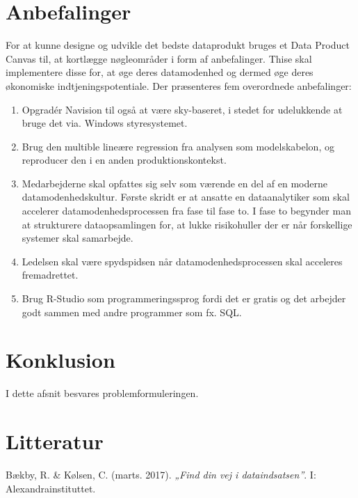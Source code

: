 \documentclass[
  12pt,
  a4paper,
  DIV=11,
  numbers=noendperiod]{scrartcl}
\providecommand{\tightlist}{%
  \setlength{\itemsep}{0pt}\setlength{\parskip}{0pt}}\usepackage{longtable,booktabs,array}
\begin{document}
\hypertarget{anbefalinger}{%
\section{Anbefalinger}\label{anbefalinger}}

For at kunne designe og udvikle det bedste dataprodukt bruges et Data
Product Canvas til, at kortlægge nøgleområder i form af anbefalinger.
Thise skal implementere disse for, at øge deres datamodenhed og dermed
øge deres økonomiske indtjeningspotentiale. Der præsenteres fem
overordnede anbefalinger:

\begin{enumerate}
\def\labelenumi{\arabic{enumi}.}
\tightlist
\item
  Opgradér Navision til også at være sky-baseret, i stedet for
  udelukkende at bruge det via. Windows styresystemet.
\item
  Brug den multible lineære regression fra analysen som modelskabelon,
  og reproducer den i en anden produktionskontekst.
\item
  Medarbejderne skal opfattes sig selv som værende en del af en moderne
  datamodenhedskultur. Første skridt er at ansatte en dataanalytiker som
  skal accelerer datamodenhedsprocessen fra fase til fase to. I fase to
  begynder man at strukturere dataopsamlingen for, at lukke risikohuller
  der er når forskellige systemer skal samarbejde.
\item
  Ledelsen skal være spydspidsen når datamodenhedsprocessen skal
  acceleres fremadrettet.
\item
  Brug R-Studio som programmeringssprog fordi det er gratis og det
  arbejder godt sammen med andre programmer som fx. SQL.
\end{enumerate}

\hypertarget{konklusion}{%
\section{Konklusion}\label{konklusion}}

I dette afsnit besvares problemformuleringen.

\hypertarget{litteratur}{%
\section{Litteratur}\label{litteratur}}

Bækby, R. \& Kølsen, C. (marts. 2017). \emph{„Find din vej i
dataindsatsen''}. I: Alexandrainstituttet.
\end{document}
